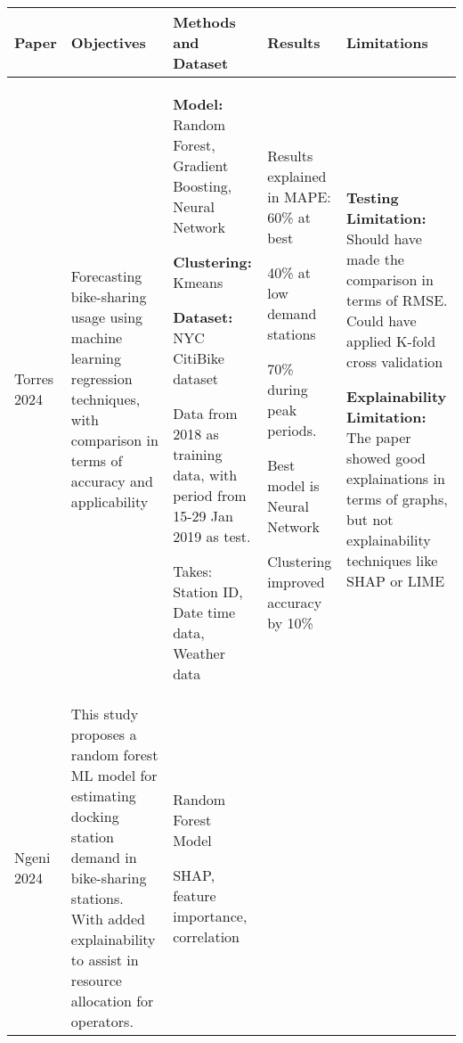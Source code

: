 \documentclass{article}
\begin{document}
\newpage
\begin{center}
\fontsize{6.5pt}{7pt}\selectfont
\setlength{\LTleft}{-10em}
\begin{longtable}{ | m{4em} | m{14em} | m{14em} | m{13em} | m{17em} |} 

  \hline  Paper & Objectives & Methods and Dataset & Results & Limitations\\
    \hline
  
    Torres 2024 & 
    \cite{Torres2024} Forecasting bike-sharing usage using machine learning regression techniques, with comparison in terms of accuracy and applicability
    
    &
    
    \textbf{Model:} Random Forest, Gradient Boosting, Neural Network
    
    \textbf{Clustering:} Kmeans



     \textbf{Dataset:}  NYC CitiBike dataset
     
Data from 2018 as training data, with period from 15-29 Jan 2019 as test.

Takes: Station ID, Date time data, Weather data

     & Results explained in MAPE:
60\% at best

40\% at low demand stations

70\% during peak periods.

Best model is Neural Network

Clustering improved accuracy by 10\%

 & 
    \newline

    \textbf{Testing Limitation:} Should have made the comparison in terms of RMSE.
Could have applied K-fold cross validation


 \textbf{Explainability Limitation:} The paper showed good explainations in terms of graphs, but not explainability techniques like SHAP or LIME


     \\

    \hline
  
    Ngeni 2024 & 
    \cite{Ngeni2024} This study proposes a random forest ML model for estimating docking station demand in bike-sharing stations. With added explainability to assist in resource allocation for operators. 
    
    &
    
    Random Forest Model
    
     SHAP, feature importance, correlation


\end{longtable}
\end{center}
\end{document}

